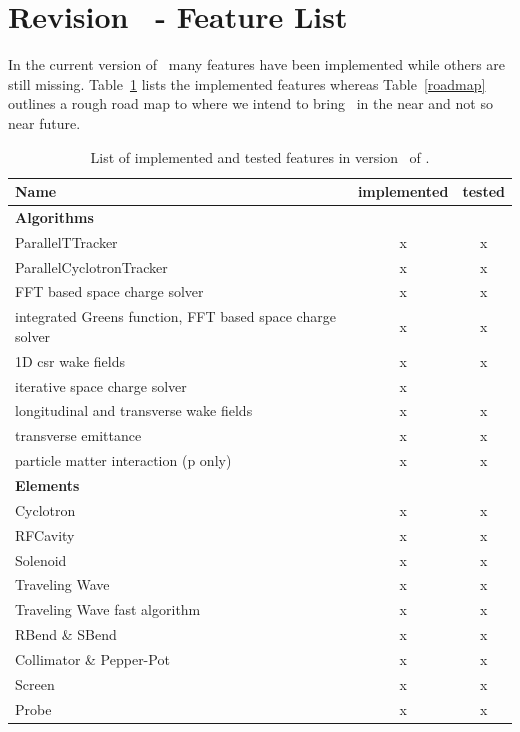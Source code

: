 \section{Revision \opalversion\ - Feature List}
\label{sec:featurelist}
In the current version of \opal\ many features have been implemented while others are still missing. 
Table~\ref{featurelist} lists the implemented features whereas Table~\ref{roadmap} outlines a rough road map to where we intend to bring \opal\ in the near and not so near future.
\begin{table}[ht] \footnotesize
  \begin{center}
    \caption{List of implemented and tested features in version \opalversion\ of \opal.}
    \label{featurelist}
    \begin{tabular}{p{5cm}cc}
      \hline
          {\bf Name} & {\bf implemented} & {\bf tested}\\
          \hline
          {\bf Algorithms} & & \\
          ParallelTTracker & x & x \\
          ParallelCyclotronTracker & x & x \\
          FFT based space charge solver & x & x \\
          integrated Greens function, FFT based space charge solver & x & x \\
          1D csr wake fields & x& x\\
          iterative space charge solver & x & \\
          longitudinal and transverse wake fields & x& x \\
          transverse emittance & x& x \\
          particle matter interaction (p only) & x & x \\
          \hline
          {\bf Elements} & & \\
          Cyclotron & x & x \\
          RFCavity & x & x \\
          Solenoid & x & x \\
          Traveling Wave & x & x \\
          Traveling Wave fast algorithm & x & x \\
          RBend \& SBend & x & x\\
          Collimator \& Pepper-Pot & x & x\\
          Screen  & x & x\\
          Probe  & x & x \\
          \hline
    \end{tabular}
  \end{center}
\end{table}
